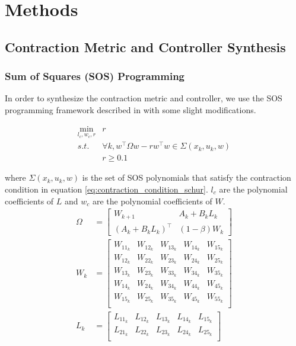 \documentclass[journal]{IEEEtran}
\begin{document}
\section{Methods}
\subsection{Contraction Metric and Controller Synthesis}
\subsubsection{Sum of Squares (SOS) Programming}
In order to synthesize the contraction metric and controller, we use the SOS programming framework described in \autocite{weiControlContractionMetric2021} with some slight modifications.

\begin{equation}
	\label{eq:dccm_opt}
	\begin{aligned}
	\min_{l_c, w_c, r} & r \\
	s.t. & \forall k, w^\top \Omega w - r w^\top w \in \Sigma(x_k, u_k, w) \\
	& r \geq 0.1
	\end{aligned}
\end{equation}

where $\Sigma(x_k, u_k, w)$ is the set of SOS polynomials that satisfy the contraction condition in equation \ref{eq:contraction_condition_schur}. $l_c$ are the polynomial coefficients of $L$ and $w_c$ are the polynomial coefficients of $W$.
\begin{equation} 
	\begin{aligned}
	\Omega &=
	\begin{bmatrix}
		W_{k+1} & A_k + B_k L_k \\
		(A_k + B_k L_k)^\top & (1 - \beta) W_k
	\end{bmatrix} \\
	W_k &= 
	\begin{bmatrix}
		W_{11_k} & W_{12_k} & W_{13_k} & W_{14_k} & W_{15_k} \\
		W_{12_k} & W_{22_k} & W_{23_k} & W_{24_k} & W_{25_k} \\
		W_{13_k} & W_{23_k} & W_{33_k} & W_{34_k} & W_{35_k} \\
		W_{14_k} & W_{24_k} & W_{34_k} & W_{44_k} & W_{45_k} \\
		W_{15_k} & W_{25_k} & W_{35_k} & W_{45_k} & W_{55_k} \\
	\end{bmatrix} \\
	L_k &=
	\begin{bmatrix}
		L_{11_k} & L_{12_k} & L_{13_k} & L_{14_k} & L_{15_k} \\
		L_{21_k} & L_{22_k} & L_{23_k} & L_{24_k} & L_{25_k} \\
	\end{bmatrix} \\
	\end{aligned}
\end{equation}
\end{document}
